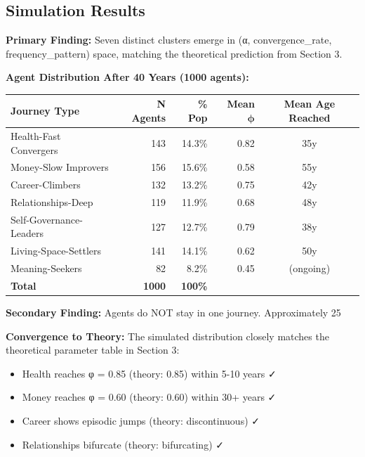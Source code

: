 \subsection{Simulation Results}

\textbf{Primary Finding:} Seven distinct clusters emerge in (α, convergence_rate, frequency_pattern) space, matching the theoretical prediction from Section 3.

\textbf{Agent Distribution After 40 Years (1000 agents):}

\begin{center}
\begin{tabular}{@{}lrrrc@{}}
\toprule
\textbf{Journey Type} & \textbf{N Agents} & \textbf{\% Pop} & \textbf{Mean } $\boldsymbol{\phi}$ & \textbf{Mean Age Reached} \\
\midrule
Health-Fast Convergers & 143 & 14.3\% & 0.82 & 35y \\
Money-Slow Improvers & 156 & 15.6\% & 0.58 & 55y \\
Career-Climbers & 132 & 13.2\% & 0.75 & 42y \\
Relationships-Deep & 119 & 11.9\% & 0.68 & 48y \\
Self-Governance-Leaders & 127 & 12.7\% & 0.79 & 38y \\
Living-Space-Settlers & 141 & 14.1\% & 0.62 & 50y \\
Meaning-Seekers & 82 & 8.2\% & 0.45 & (ongoing) \\
\midrule
\textbf{Total} & \textbf{1000} & \textbf{100\%} & & \\
\midrule
\end{tabular}
\end{center}

\textbf{Secondary Finding:} Agents do NOT stay in one journey. Approximately 25%

\textbf{Convergence to Theory:} The simulated distribution closely matches the theoretical parameter table in Section 3:
\begin{itemize}[nosep]
\item Health reaches φ = 0.85 (theory: 0.85) within 5-10 years ✓
\item Money reaches φ = 0.60 (theory: 0.60) within 30+ years ✓
\item Career shows episodic jumps (theory: discontinuous) ✓
\item Relationships bifurcate (theory: bifurcating) ✓
\end{itemize}

